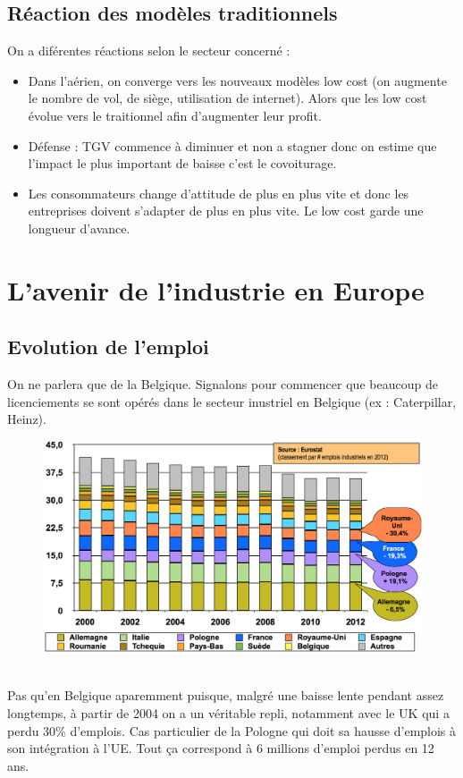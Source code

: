 \subsection{Réaction des modèles traditionnels}
On a diférentes réactions selon le secteur concerné :
\begin{itemize}
	\item Dans l'aérien, on converge vers les nouveaux modèles low cost (on augmente le nombre de vol, de siège, utilisation de internet). Alors que les low cost évolue vers le traitionnel afin d'augmenter leur profit.
	      
	\item Défense : TGV commence à diminuer et non a stagner donc on estime que l’impact le plus important de  baisse c’est le covoiturage. 
	      
	\item Les consommateurs change d’attitude de plus en plus vite et donc les entreprises doivent s’adapter de plus en plus vite. Le low cost garde une longueur d'avance. 
\end{itemize}
\newpage

\section{L'avenir de l'industrie en Europe}
\subsection{Evolution de l'emploi}
On ne parlera que de la Belgique. Signalons pour commencer que beaucoup de licenciements se sont opérés dans le secteur inustriel en Belgique (ex : Caterpillar, Heinz). 
\begin{figure}
	\includegraphics[scale=0.3]{66}
\end{figure}
\ \\
Pas qu'en Belgique aparemment puisque, malgré une baisse lente pendant assez longtemps, à partir de 2004 on a un véritable repli, notamment avec le UK qui a perdu 30\% d'emplois. Cas particulier de la Pologne qui doit sa hausse d'emplois à son intégration à l’UE. Tout ça correspond à 6 millions d'emploi perdus en 12 ans. 

